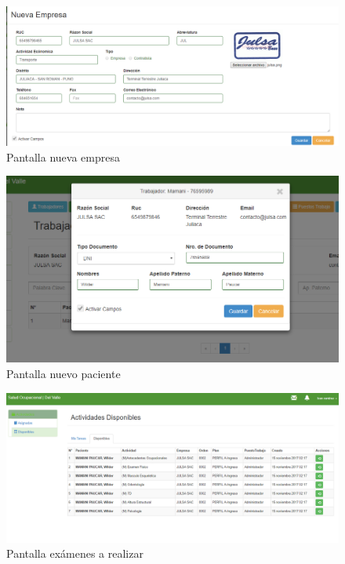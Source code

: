 			\begin{figure}[H]
			    \centering
				\includegraphics[width=18cm]{../imgs/ui/nueva-empresa.png}
				\caption{Pantalla nueva empresa}
				\label{figure:nueva-empresa}
			\end{figure}
			
			\begin{figure}[H]
			    \centering
				\includegraphics[width=18cm]{../imgs/ui/paciente.png}
				\caption{Pantalla nuevo paciente}
				\label{figure:paciente}
			\end{figure}
			
			\begin{figure}[H]
			    \centering
				\includegraphics[width=18cm]{../imgs/ui/disponibles.png}
				\caption{Pantalla exámenes a realizar}
				\label{figure:disponibles}
			\end{figure}
			
